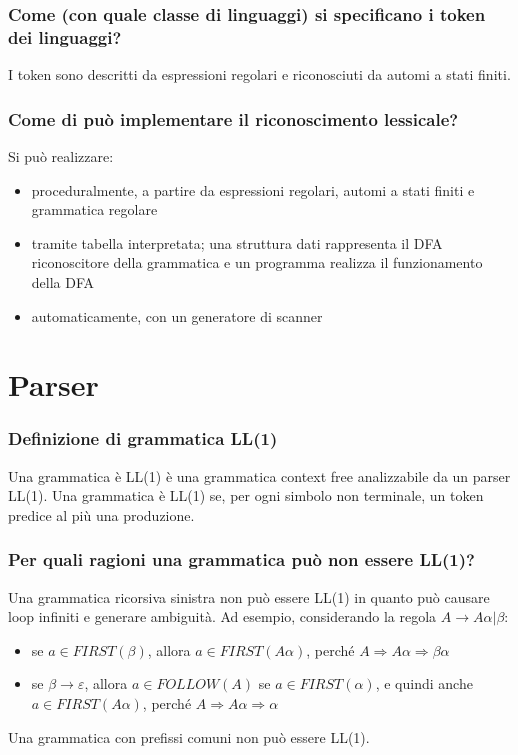 \documentclass[11pt]{article}
\begin{document}
\subsubsection*{Come (con quale classe di linguaggi) si specificano i token dei linguaggi?}
I token sono descritti da espressioni regolari e riconosciuti da automi a stati finiti.
\subsubsection*{Come di può implementare il riconoscimento lessicale?}
Si può realizzare:
\begin{itemize}
    \item proceduralmente, a partire da espressioni regolari, automi a stati finiti e grammatica regolare
    \item tramite tabella interpretata; una struttura dati rappresenta il DFA riconoscitore della grammatica e un programma
    realizza il funzionamento della DFA
    \item automaticamente, con un generatore di scanner 
\end{itemize}
\section*{Parser}
\subsubsection*{Definizione di grammatica LL(1)}
Una grammatica è LL(1) è una grammatica context free analizzabile da un parser LL(1). Una grammatica è LL(1) se, per ogni 
simbolo non terminale, un token predice al più una produzione.
\subsubsection*{Per quali ragioni una grammatica può non essere LL(1)?}
Una grammatica ricorsiva sinistra non può essere LL(1) in quanto può causare loop infiniti e generare ambiguità. Ad esempio, 
considerando la regola $A\rightarrow A\alpha|\beta$:
\begin{itemize}
    \item se $a\in FIRST(\beta)$, allora $a\in FIRST(A\alpha)$, perché $A\Rightarrow A\alpha\Rightarrow\beta\alpha$
    \item se $\beta\rightarrow\varepsilon$, allora $a\in FOLLOW(A)$ se $a\in FIRST(\alpha)$, e quindi anche $a\in FIRST(A\alpha)$,
    perché $A\Rightarrow A\alpha\Rightarrow\alpha$
\end{itemize}
Una grammatica con prefissi comuni non può essere LL(1).
\end{document}
